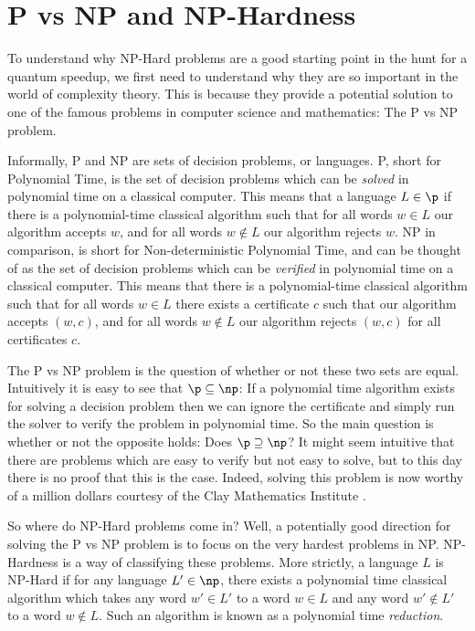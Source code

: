 \section{P vs NP and NP-Hardness}
\label{sec:p-vs-np}

To understand why NP-Hard problems are a good starting point in the hunt for a quantum speedup, we first need to understand why they are so important in the world of complexity theory. This is because they provide a potential solution to one of the famous problems in computer science and mathematics: The P vs NP problem.

Informally, P and NP are sets of decision problems, or languages. P, short for Polynomial Time, is the set of decision problems which can be \textit{solved} in polynomial time on a classical computer. This means that a language $L \in \p$ if there is a polynomial-time classical algorithm such that for all words $w \in L$ our algorithm accepts $w$, and for all words $w \notin L$ our algorithm rejects $w$. NP in comparison, is short for Non-deterministic Polynomial Time, and can be thought of as the set of decision problems which can be \textit{verified} in polynomial time on a classical computer. This means that there is a polynomial-time classical algorithm such that for all words $w \in L$ there exists a certificate $c$ such that our algorithm accepts $(w,c)$, and for all words $w \notin L$ our algorithm rejects $(w,c)$ for all certificates $c$.

The P vs NP problem is the question of whether or not these two sets are equal. Intuitively it is easy to see that $\p \subseteq \np$: If a polynomial time algorithm exists for solving a decision problem then we can ignore the certificate and simply run the solver to verify the problem in polynomial time. So the main question is whether or not the opposite holds: Does $\p \supseteq \np$? It might seem intuitive that there are problems which are easy to verify but not easy to solve, but to this day there is no proof that this is the case. Indeed, solving this problem is now worthy of a million dollars courtesy of the Clay Mathematics Institute \cite{cmipvsnp}.

So where do NP-Hard problems come in? Well, a potentially good direction for solving the P vs NP problem is to focus on the very hardest problems in NP. NP-Hardness is a way of classifying these problems. More strictly, a language $L$ is NP-Hard if for any language $L' \in \np$, there exists a polynomial time classical algorithm which takes any word $w'\in L'$ to a word $w \in L$ and any word $w'\notin L'$ to a word $w \notin L$. Such an algorithm is known as a polynomial time \textit{reduction}.

